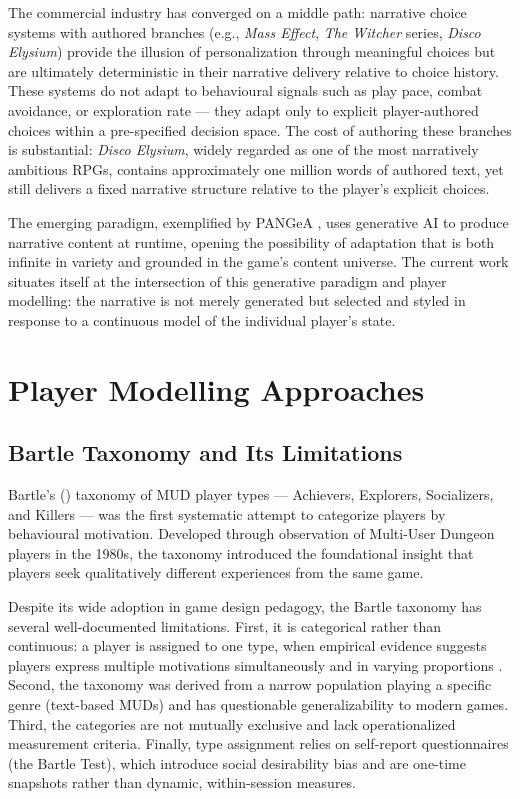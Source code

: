 \documentclass[12pt,a4paper]{report}
\begin{document}
The commercial industry has converged on a middle path: narrative choice systems with authored branches (e.g., \textit{Mass Effect}, \textit{The Witcher} series, \textit{Disco Elysium}) provide the illusion of personalization through meaningful choices but are ultimately deterministic in their narrative delivery relative to choice history. These systems do not adapt to behavioural signals such as play pace, combat avoidance, or exploration rate --- they adapt only to explicit player-authored choices within a pre-specified decision space. The cost of authoring these branches is substantial: \textit{Disco Elysium}, widely regarded as one of the most narratively ambitious RPGs, contains approximately one million words of authored text, yet still delivers a fixed narrative structure relative to the player's explicit choices.

The emerging paradigm, exemplified by PANGeA \citep{todd2024pangea}, uses generative AI to produce narrative content at runtime, opening the possibility of adaptation that is both infinite in variety and grounded in the game's content universe. The current work situates itself at the intersection of this generative paradigm and player modelling: the narrative is not merely generated but selected and styled in response to a continuous model of the individual player's state.

\section{Player Modelling Approaches}

\subsection{Bartle Taxonomy and Its Limitations}

Bartle's (\citeyear{bartle1996hearts}) taxonomy of MUD player types --- Achievers, Explorers, Socializers, and Killers --- was the first systematic attempt to categorize players by behavioural motivation. Developed through observation of Multi-User Dungeon players in the 1980s, the taxonomy introduced the foundational insight that players seek qualitatively different experiences from the same game.

Despite its wide adoption in game design pedagogy, the Bartle taxonomy has several well-documented limitations. First, it is categorical rather than continuous: a player is assigned to one type, when empirical evidence suggests players express multiple motivations simultaneously and in varying proportions \citep{yee2006motivations}. Second, the taxonomy was derived from a narrow population playing a specific genre (text-based MUDs) and has questionable generalizability to modern games. Third, the categories are not mutually exclusive and lack operationalized measurement criteria. Finally, type assignment relies on self-report questionnaires (the Bartle Test), which introduce social desirability bias and are one-time snapshots rather than dynamic, within-session measures.
\end{document}
